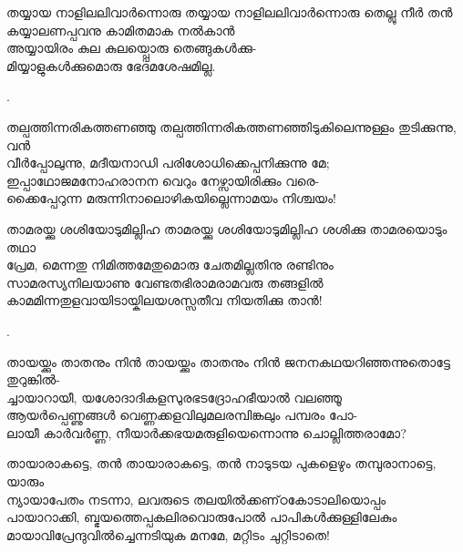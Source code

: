\begin{enumerate}

\begin{slokam}{\VVt}{\Ull}{തയ്യായ നാളിലലിവാർന്നൊരു}
തയ്യായ നാളിലലിവാർന്നൊരു തെല്ലു നീർ തൻ\\
കയ്യാലണപ്പവനു കാമിതമാക നൽകാൻ\\
അയ്യായിരം കുല കുലയ്പ്പൊരു തെങ്ങുകള്‍ക്കു-\\
മിയ്യാളുകള്‍ക്കുമൊരു ഭേദമശേഷമില്ല.
\end{slokam}


.


\begin{slokam}{\VSv}{\VKG}{തല്പത്തിന്നരികത്തണഞ്ഞു}
തല്പത്തിന്നരികത്തണഞ്ഞിടുകിലെന്നുള്ളം തുടിക്കുന്നു, വൻ\\
വീർപ്പോലുന്നു, മദീയനാഡി പരിശോധിക്കെപ്പനിക്കുന്നു മേ; \\
ഇപ്പാഥോജമനോഹരാനന വെറും നേഴ്സായിരിക്കും വരെ-\\
ക്കൈപ്പേറുന്ന മരുന്നിനാലൊഴികയില്ലെന്നാമയം നിശ്ചയം! 
\end{slokam}



\begin{slokam}{\VKm}{\KV}{താമരയ്ക്കു ശശിയോടുമില്ലിഹ}
താമരയ്ക്കു ശശിയോടുമില്ലിഹ ശശിക്കു താമരയൊടും തഥാ\\
പ്രേമ, മെന്നതു നിമിത്തമേതുമൊരു ചേതമില്ലതിനു രണ്ടിനും\\
സാമരസ്യനിലയാണു വേണ്ടതഭിരാമരാമവരു തങ്ങളിൽ\\
കാമമിന്നതുളവായിടായ്കിലയശസ്സതീവ നിയതിക്കു താൻ!
\end{slokam}


.

\begin{slokam}{\VSr}{\VKG}{തായയ്ക്കും താതനും നിൻ}
തായയ്ക്കും താതനും നിൻ ജനനകഥയറിഞ്ഞന്നുതൊട്ടേ തുറുങ്കിൽ-\\
ച്ചായാറായീ, യശോദാദികളസുരഭടദ്രോഹഭീയാൽ വലഞ്ഞൂ\\
ആയർപ്പെണ്ണുങ്ങള്‍ വെണ്ണക്കളവിലുമലരമ്പിങ്കലും പമ്പരം പോ-\\
ലായീ കാർവർണ്ണ, നീയാർക്കഭയമരുളിയെന്നൊന്നു ചൊല്ലിത്തരാമോ?
\end{slokam}



\begin{slokam}{\VSr}{\Ull}{തായാരാകട്ടെ, തൻ}
തായാരാകട്ടെ, തൻ നാടുടയ പുകളെഴും തമ്പുരാനാട്ടെ, യാരും\\
ന്യായാപേതം നടന്നാ, ലവരുടെ തലയിൽക്കണ്‌ഠകോടാലിയൊപ്പം\\
പായാറാക്കി, ബ്ഭയത്തെപ്പകലിരവൊരുപോൽ പാപികള്‍ക്കുള്ളിലേകും\\
മായാവിപ്രേന്ദുവിൽച്ചെന്നടിയുക മനമേ, മറ്റിടം ചുറ്റിടാതെ!
\end{slokam}


\end{enumerate}
